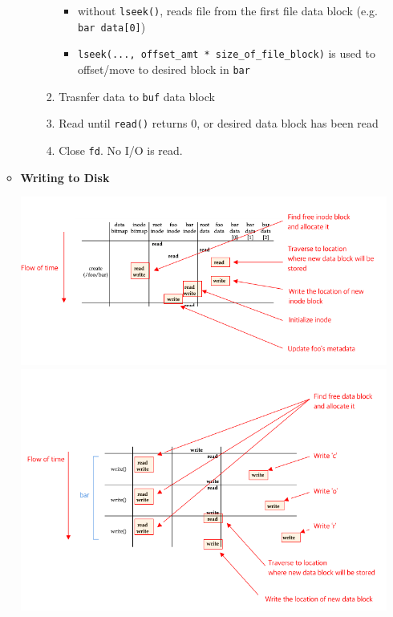 \documentclass[12pt]{article}
\begin{document}
\begin{enumerate}[1.]
\begin{itemize}
\begin{itemize}
\begin{enumerate}[1.]
                \begin{itemize}
                    \item without \texttt{lseek()}, reads file from the first file data block (e.g. \texttt{bar data[0]})
                    \item \texttt{lseek(..., offset\_amt * size\_of\_file\_block)} is used to offset/move to desired block in \texttt{bar}
                \end{itemize}

                \item Trasnfer data to \texttt{buf} data block

                \item Read until \texttt{read()} returns 0, or desired data block has been read
                \item Close \texttt{fd}. No I/O is read.
            \end{enumerate}
        \end{itemize}

        \item \textbf{Writing to Disk}

        \begin{center}
        \includegraphics[width=\linewidth]{../images/midterm_4_solution_30.png}
        \includegraphics[width=\linewidth]{../images/midterm_4_solution_31.png}
        \end{center}


\end{itemize}
\end{enumerate}
\end{document}
